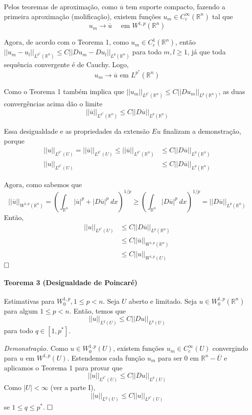 \documentclass[11pt]{article}
\newcommand{\qed}{$\hfill\square$}
\newcommand{\Rn}{{\mathbb{R}^n}}
\newcommand{\nor}[2]{||#1||_{#2}}
\begin{document}
Pelos teoremas de aproximação, como $\overline{u}$ tem suporte compacto, fazendo a primeira aproximação (molificação), existem funções $ u_m \in C^\infty_c(\Rn) $ tal que \[ u_m \rightarrow \overline{u} \quad \text{ em } W^{1,p}(\Rn) \]

Agora, de acordo com o Teorema 1, como $u_m \in C^1_c(\Rn)$, então $ ||u_m - u_l||_{L^{p^*}(\Rn)} \leq C ||Du_m  - Du_l||_{L^p(\Rn)} $ para todo $m,l \geq 1$, já que toda sequência convergente é de Cauchy. Logo, \[ u_m \rightarrow \overline{u} \text{ em } L^{p^*}(\Rn) \]

Como o Teorema 1 também implica que $ ||u_m||_{L^{p^*}(\Rn)} \leq C ||Du_m||_{L^p(\Rn)} $, as duas convergências acima dão o limite \[ ||\overline{u}||_{L^{p^*}(\Rn)} \leq C ||D\overline{u}||_{L^{p}(\Rn)} \]

Essa desigualdade e as propriedades da extensão $Eu$ finalizam a demonstração, porque \begin{align*}
	 ||u||_{L^{p^*}(U)} = ||\overline{u}||_{L^{p^*}(U)} \leq ||\overline{u}||_{L^{p^*}(\Rn)} &\leq  C ||D\overline{u}||_{L^{p}(\Rn)} \\
	  ||u||_{L^{p^*}(U)}  &\leq  C ||D\overline{u}||_{L^{p}(\Rn)}
\end{align*}

Agora, como sabemos que \[ ||\overline{u}||_{W^{1,p}(\Rn)} = \left( \int_\Rn |\overline{u}|^p + |D\overline{u}|^p\ dx \right)^{1/p} \geq \left(\int_\Rn |D\overline{u}|^p\ dx \right)^{1/p} = ||D\overline{u}||_{L^p(\Rn)}\] Então, \begin{align*}
	 ||u||_{L^{p^*}(U)}  &\leq  C ||D\overline{u}||_{L^{p}(\Rn)} \\
	  &\leq  C ||\overline{u}||_{W^{1,p}(\Rn)} \\
	  &\leq   C \nor{u}{W^{1,p}(U)} 
\end{align*}\qed





\paragraph{Teorema 3 (Desigualdade de Poincaré)}\label{t:sobolev-ineq-t3} Estimativas para \( W^{1,p}_0, 1 \leq p < n\). Seja \(U\) aberto e limitado. Seja $u \in W^{1,p}_0(\mathbb{R}^n)$ para algum \(1 \leq p < n\). Então, temos que \[ ||u||_{L^q(U)} \leq C ||Du||_{L^p(U)} \] para todo \( q \in [1, p^*]\). 

\textit{Demonstração.} Como $u \in W^{1,p}_0(U)$, existem funções $u_m \in C^\infty_c(U)$ convergindo para $u$ em $ W^{1,p}(U)$. Estendemos cada função $u_m$ para ser 0 em $\Rn-\overline{U}$ e aplicamos o Teorema 1 para provar que \[ ||u||_{L^{p^*}(U)} \leq C ||Du||_{L^p(U)} \] Como $ |U| < \infty  $ (ver a parte I), \[ ||u||_{L^q(U)} \leq C||u||_{L^{p^*}(U)} \] se $1 \leq q \leq p^*$. \qed
\end{document}
